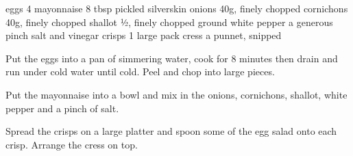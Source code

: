 


\begin{ingreds}
    eggs 4
    mayonnaise 8 tbsp
    pickled silverskin onions 40g, finely chopped
    cornichons 40g, finely chopped
    shallot ½, finely chopped
    ground white pepper a generous pinch
    salt and vinegar crisps 1 large pack
    cress a punnet, snipped
\end{ingreds}

\begin{method}
    Put the eggs into a pan of simmering water, cook for 8 minutes then drain and run under 
    cold water until cold. Peel and chop into large pieces.

    Put the mayonnaise into a bowl and mix in the onions, cornichons, shallot, white pepper 
    and a pinch of salt.

    Spread the crisps on a large platter and spoon some of the egg salad onto each crisp. 
    Arrange the cress on top.
\end{method}